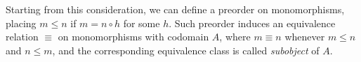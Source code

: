 \begin{definition}[Subobject]\label{def:subobj}
    Starting from this consideration, we can define a preorder on monomorphisms, placing $m \leq n$ if $m = n \circ h$ for some $h$. Such preorder induces an equivalence relation $\equiv$ on monomorphisms with codomain $A$, where $m \equiv n$ whenever $m \leq n$ and $n \leq m$, and the corresponding equivalence class is called \emph{subobject} of $A$.
\end{definition}







